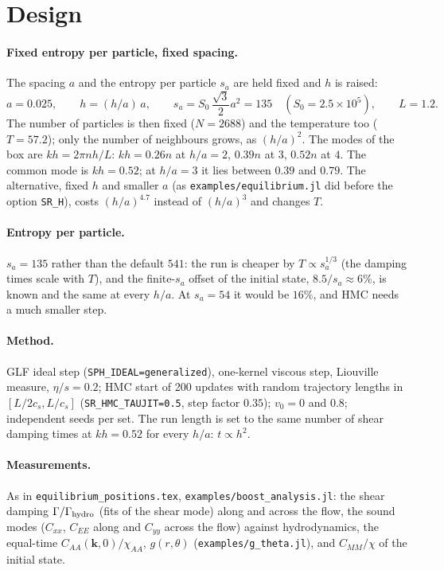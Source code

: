 \documentclass[11pt,aps,preprint,nofootinbib,superscriptaddress,tightenlines]{revtex4-2}
\def\st{\begin{equation}}
\def\stp{\end{equation}}
\let\oldparagraph\paragraph
\renewcommand{\paragraph}{\par\bigskip\oldparagraph}
\begin{document}
\section{Design}

\paragraph{Fixed entropy per particle, fixed spacing.}  The spacing $a$ and the entropy per particle $s_a$ are held fixed and $h$ is raised:
\st
a=0.025,\qquad h=(h/a)\,a,\qquad s_a=S_0\,\frac{\sqrt3}{2}a^2=135\quad(S_0=2.5\times10^5),\qquad L=1.2 .
\stp
The number of particles is then fixed ($N=2688$) and the temperature too ($T=57.2$); only the number of neighbours grows, as $(h/a)^2$.  The
modes of the box are $kh=2\pi n h/L$: $kh=0.26n$ at $h/a=2$, $0.39n$ at $3$, $0.52n$ at $4$.  The common mode is $kh=0.52$; at $h/a=3$ it lies
between $0.39$ and $0.79$.  The alternative, fixed $h$ and smaller $a$ (as \texttt{examples/equilibrium.jl} did before the option
\texttt{SR\_H}), costs $(h/a)^{4.7}$ instead of $(h/a)^3$ and changes $T$.

\paragraph{Entropy per particle.}  $s_a=135$ rather than the default $541$: the run is cheaper by $T\propto s_a^{1/3}$ (the damping times scale
with $T$), and the finite-$s_a$ offset of the initial state, $8.5/s_a\approx6\%$, is known and the same at every $h/a$.  At $s_a=54$ it would
be $16\%$, and HMC needs a much smaller step.

\paragraph{Method.}  GLF ideal step (\texttt{SPH\_IDEAL=generalized}), one-kernel viscous step, Liouville measure, $\eta/s=0.2$; HMC start of 200
updates with random trajectory lengths in $[L/2c_s,L/c_s]$ (\texttt{SR\_HMC\_TAUJIT=0.5}, step factor $0.35$); $v_0=0$ and $0.8$; independent seeds
per set.  The run length is set to the same number of shear damping times at $kh=0.52$ for every $h/a$: $t\propto h^2$.

\paragraph{Measurements.}  As in \texttt{equilibrium\_positions.tex}, \texttt{examples/boost\_analysis.jl}: the shear damping $\Gamma/\Gamma_{\rm hydro}$
(fits of the shear mode) along and across the flow, the sound modes ($C_{xx}$, $C_{EE}$ along and $C_{yy}$ across the flow) against hydrodynamics, the
equal-time $C_{AA}(\bm k,0)/\chi_{AA}$, $g(r,\theta)$ (\texttt{examples/g\_theta.jl}), and $C_{MM}/\chi$ of the initial state.
\end{document}
